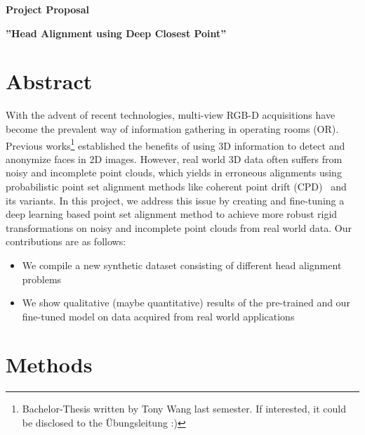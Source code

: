 \documentclass[a4paper,pagesize 10pt]{scrartcl}
\begin{document}
\begin{center}{\Huge\textbf{Project Proposal}}\end{center}
\begin{center}{\Large\textbf{''Head Alignment using Deep Closest Point''}}\end{center}

\section{Abstract}


With the advent of recent technologies, multi-view RGB-D acquisitions have become the prevalent way of information gathering in operating rooms (OR).
Previous works\footnote{Bachelor-Thesis written by Tony Wang last semester. If interested, it could be disclosed to the Übungsleitung :)} established the benefits of using 3D information to detect and anonymize faces in 2D images.
However, real world 3D data often suffers from noisy and incomplete point clouds, which yields in erroneous alignments using probabilistic point set alignment methods like coherent point drift (CPD)~\cite{cpd} and its variants.
In this project, we address this issue by creating and fine-tuning a deep learning based point set alignment method to achieve more robust rigid transformations on noisy and incomplete point clouds from real world data.
Our contributions are as follows:
 
\begin{itemize}
\itemsep0em
	\item We compile a new synthetic dataset consisting of different head alignment problems
	\item We show qualitative (maybe quantitative) results of the pre-trained and our fine-tuned model on data acquired from real world applications
\end{itemize}


\section{Methods}
\end{document}

